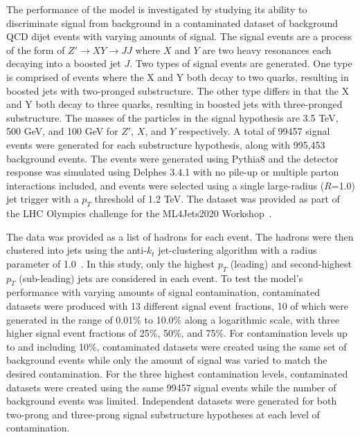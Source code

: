 \documentclass[12pt, a4paper]{article}
\begin{document}
The performance of the model is investigated by studying its ability to discriminate signal from background in a contaminated dataset of background QCD dijet events with varying amounts of signal. The signal events are a process of the form of $Z'\rightarrow XY \rightarrow JJ$ where $X$ and $Y$ are two heavy resonances each decaying into a boosted jet $J$. Two types of signal events are generated. One type is comprised of events where the X and Y both decay to two quarks, resulting in boosted jets with two-pronged substructure. The other type differs in that the X and Y both decay to three quarks, resulting in boosted jets with three-pronged substructure. The masses of the particles in the signal hypothesis are 3.5 TeV, 500 GeV, and 100 GeV for $Z'$, $X$, and $Y$ respectively. A total of 99457 signal events were generated for each substructure hypothesis, along with 995,453 background events. The events were generated using {\sc Pythia8} and the detector response was simulated using {\sc Delphes 3.4.1} with no pile-up or multiple parton interactions included, and events were selected using a single large-radius ($R$=1.0) jet trigger with a $p_T$ threshold of 1.2 TeV. The dataset was provided as part of the LHC Olympics challenge for the ML4Jets2020 Workshop~\cite{dataset}. 

The data was provided as a list of hadrons for each event. The hadrons were then clustered into jets using the anti-$k_{t}$ jet-clustering algorithm with a radius parameter of 1.0~\cite{Cacciari_2008}. In this study, only the highest $p_{T}$ (leading) and second-highest $p_{T}$ (sub-leading) jets are considered in each event. To test the model's performance with varying amounts of signal contamination, contaminated datasets were produced with 13 different signal event fractions, 10 of which were generated in the range of 0.01\% to 10.0\% along a logarithmic scale, with three higher signal event fractions of 25\%, 50\%, and 75\%. For contamination levels up to and including 10\%, contaminated datasets were created using the same set of background events while only the amount of signal was varied to match the desired contamination. For the three highest contamination levels, contaminated datasets were created using the same 99457 signal events while the number of background events was limited. 
Independent datasets were generated for both two-prong and three-prong signal substructure hypotheses at each level of contamination.
\end{document}
